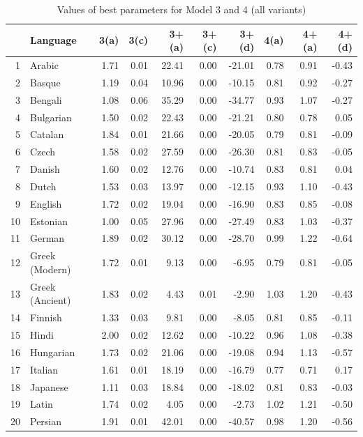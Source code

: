 \documentclass[a4paper]{article}
\begin{document}
\begin{table}[hbtp]
\caption { Values of best parameters for Model 3 and 4 (all variants)}
\centering
\begin{tabular}{rlrrrrrrrr}
  \hline
 & Language & 3(a) & 3(c) & 3+(a) & 3+(c) & 3+(d) & 4(a) & 4+(a) & 4+(d) \\ 
  \hline
1 & Arabic & 1.71 & 0.01 & 22.41 & 0.00 & -21.01 & 0.78 & 0.91 & -0.43 \\ 
  2 & Basque & 1.19 & 0.04 & 10.96 & 0.00 & -10.15 & 0.81 & 0.92 & -0.27 \\ 
  3 & Bengali & 1.08 & 0.06 & 35.29 & 0.00 & -34.77 & 0.93 & 1.07 & -0.27 \\ 
  4 & Bulgarian & 1.50 & 0.02 & 22.43 & 0.00 & -21.21 & 0.80 & 0.78 & 0.05 \\ 
  5 & Catalan & 1.84 & 0.01 & 21.66 & 0.00 & -20.05 & 0.79 & 0.81 & -0.09 \\ 
  6 & Czech & 1.58 & 0.02 & 27.59 & 0.00 & -26.30 & 0.81 & 0.83 & -0.05 \\ 
  7 & Danish & 1.60 & 0.02 & 12.76 & 0.00 & -10.74 & 0.83 & 0.81 & 0.04 \\ 
  8 & Dutch & 1.53 & 0.03 & 13.97 & 0.00 & -12.15 & 0.93 & 1.10 & -0.43 \\ 
  9 & English & 1.72 & 0.02 & 19.04 & 0.00 & -16.90 & 0.83 & 0.85 & -0.08 \\ 
  10 & Estonian & 1.00 & 0.05 & 27.96 & 0.00 & -27.49 & 0.83 & 1.03 & -0.37 \\ 
  11 & German & 1.89 & 0.02 & 30.12 & 0.00 & -28.70 & 0.99 & 1.22 & -0.64 \\ 
  12 & Greek (Modern) & 1.72 & 0.01 & 9.13 & 0.00 & -6.95 & 0.79 & 0.81 & -0.05 \\ 
  13 & Greek (Ancient) & 1.83 & 0.02 & 4.43 & 0.01 & -2.90 & 1.03 & 1.20 & -0.43 \\ 
  14 & Finnish & 1.33 & 0.03 & 9.81 & 0.00 & -8.05 & 0.81 & 0.85 & -0.11 \\ 
  15 & Hindi & 2.00 & 0.02 & 12.62 & 0.00 & -10.22 & 0.96 & 1.08 & -0.38 \\ 
  16 & Hungarian & 1.73 & 0.02 & 21.06 & 0.00 & -19.08 & 0.94 & 1.13 & -0.57 \\ 
  17 & Italian & 1.61 & 0.01 & 18.19 & 0.00 & -16.79 & 0.77 & 0.71 & 0.17 \\ 
  18 & Japanese & 1.11 & 0.03 & 18.84 & 0.00 & -18.02 & 0.81 & 0.83 & -0.03 \\ 
  19 & Latin & 1.74 & 0.02 & 4.05 & 0.00 & -2.73 & 1.02 & 1.21 & -0.50 \\ 
  20 & Persian & 1.91 & 0.01 & 42.01 & 0.00 & -40.57 & 0.98 & 1.20 & -0.56 \\ 

\end{tabular}
\end{table}
\end{document}
